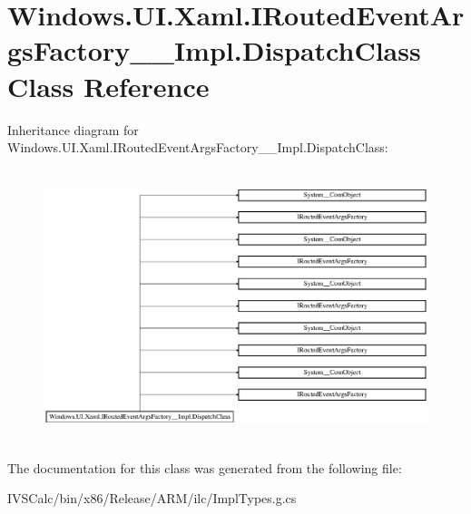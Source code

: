 \hypertarget{class_windows_1_1_u_i_1_1_xaml_1_1_i_routed_event_args_factory_____impl_1_1_dispatch_class}{}\section{Windows.\+U\+I.\+Xaml.\+I\+Routed\+Event\+Args\+Factory\+\_\+\+\_\+\+Impl.\+Dispatch\+Class Class Reference}
\label{class_windows_1_1_u_i_1_1_xaml_1_1_i_routed_event_args_factory_____impl_1_1_dispatch_class}
Inheritance diagram for Windows.\+U\+I.\+Xaml.\+I\+Routed\+Event\+Args\+Factory\+\_\+\+\_\+\+Impl.\+Dispatch\+Class\+:\begin{figure}[H]
\begin{center}
\leavevmode
\includegraphics[height=7.979275cm]{class_windows_1_1_u_i_1_1_xaml_1_1_i_routed_event_args_factory_____impl_1_1_dispatch_class}
\end{center}
\end{figure}


The documentation for this class was generated from the following file\+:\begin{DoxyCompactItemize}
\item 
I\+V\+S\+Calc/bin/x86/\+Release/\+A\+R\+M/ilc/Impl\+Types.\+g.\+cs\end{DoxyCompactItemize}
